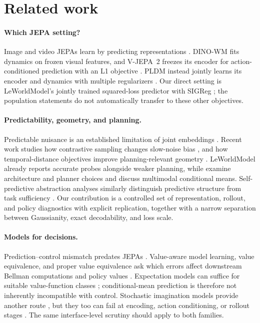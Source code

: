 \section{Related work}
\label{sec:related}

\paragraph{Which JEPA setting?}
Image and video JEPAs learn by predicting representations
\citep{assran2023ijepa,bardes2024vjepa}. DINO-WM fits dynamics on frozen visual features, and V-JEPA~2
freezes its encoder for action-conditioned prediction with an L1 objective
\citep{zhou2024dinowm,assran2025vjepa2}. PLDM instead jointly learns its encoder and dynamics with
multiple regularizers \citep{sobal2025pldm}. Our direct setting is LeWorldModel's jointly trained
squared-loss predictor with SIGReg \citep{maes2026lewm,balestriero2025lejepa}; the population statements
do not automatically transfer to these other objectives.

\paragraph{Predictability, geometry, and planning.}
Predictable nuisance is an established limitation of joint embeddings \citep{sobal2022slow}.
Recent work studies how contrastive sampling changes slow-noise bias
\citep{gulati2026contrast}, and how temporal-distance objectives improve planning-relevant geometry
\citep{bai2026temporal}. LeWorldModel already reports accurate probes alongside weaker planning,
while \citet{terver2026planning} examine architecture and planner choices and discuss multimodal
conditional means. Self-predictive abstraction analyses similarly distinguish predictive structure
from task sufficiency \citep{tang2023selfpredictive,ni2024bridging}. Our contribution is a controlled
set of representation, rollout, and policy diagnostics with explicit replication, together with a
narrow separation between Gaussianity, exact decodability, and loss scale.

\paragraph{Models for decisions.}
Prediction--control mismatch predates JEPAs \citep{lambert2020objective}. Value-aware model learning,
value equivalence, and proper value equivalence ask which errors affect downstream Bellman
computations and policy values \citep{farahmand2017vaml,grimm2020value,grimm2021proper}.
Expectation models can suffice for suitable value-function classes \citep{wan2019expectation};
conditional-mean prediction is therefore not inherently incompatible with control. Stochastic
imagination models provide another route \citep{hafner2020dreamer,alonso2024diamond,hafner2025dreamer4},
but they too can fail at encoding, action conditioning, or rollout stages
\citep{hansen2026hallucination}. The same interface-level scrutiny should apply to both families.
